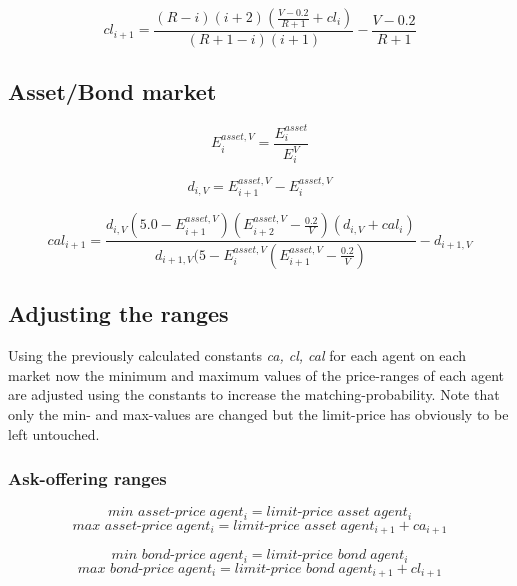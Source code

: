 \documentclass[Bachelorarbeit.tex]{subfiles}
\begin{document}
\begin{equation}
cl_{i+1} = \frac{(R-i)(i+2)(\frac{V-0.2}{R+1} + cl_i)}{(R+1-i)(i+1)} - \frac{V - 0.2}{R+1}
\end{equation}

\subsection{Asset/Bond market}

\begin{equation}
E_{i}^{asset,V} = \frac{E_{i}^{asset}}{E_{i}^{V}}
\end{equation}

\begin{equation}
d_{i,V} = E_{i+1}^{asset,V} - E_{i}^{asset,V}
\end{equation}

\begin{equation}
cal_{i+1} = \frac{d_{i,V}(5.0 - E_{i+1}^{asset,V})(E_{i+2}^{asset,V} -\frac{0.2}{V})(d_{i,V} + cal_i)}{d_{i+1,V}(5 - E_{i}^{asset,V}(E_{i+1}^{asset,V} - \frac{0.2}{V})} - d_{i+1,V}
\end{equation}

\subsection{Adjusting the ranges}
Using the previously calculated constants \textit{ca, cl, cal} for each agent on each market now the minimum and maximum values of the price-ranges of each agent are adjusted using the constants to increase the matching-probability. Note that only the min- and max-values are changed but the limit-price has obviously to be left untouched.

\subsubsection{Ask-offering ranges}
\begin{equation}
\textit{min asset-price} \; agent_{i}  = \textit{limit-price asset} \; agent_{i}
\end{equation}
\begin{equation}
\textit{max asset-price} \; agent_{i} = \textit{limit-price asset} \; agent_{i+1} + ca_{i+1}
\end{equation}

\begin{equation}
\textit{min bond-price} \; agent_{i} = \textit{limit-price bond} \; agent_{i}
\end{equation}
\begin{equation}
\textit{max bond-price} \; agent_{i} = \textit{limit-price bond} \; agent_{i+1} + cl_{i+1}
\end{equation}
\end{document}
